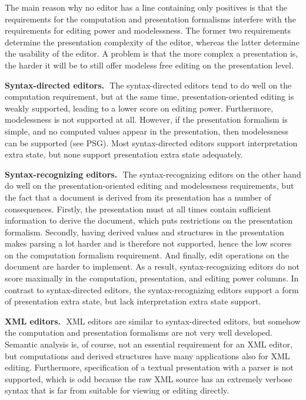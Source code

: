 \documentclass{entcs}
\begin{document}
The main reason why no editor has a line containing only positives is that the requirements for the computation and presentation formalisms interfere with the requirements for editing power and modelessness. The former two requirements determine the presentation complexity of the editor, whereas the latter determine the usability of the editor. A problem is that the more complex a presentation is, the harder it will be to still offer modeless free editing on the presentation level.

{\bf Syntax-directed editors.}~\,The syntax-directed editors tend to do well on the computation requirement, but at the same time, presentation-oriented editing is weakly supported, leading to a lower score on editing power. Furthermore, modelessness is not supported at all. However, if the presentation formalism is simple, and no computed values appear in the presentation, then modelessness can be supported (see PSG). Most syntax-directed editors support interpretation extra state, but none support presentation extra state adequately.

{\bf Syntax-recognizing editors.}~\,The syntax-recognizing editors on the other hand do well on the presentation-oriented editing and modelessness requirements, but the fact that a document is derived from its presentation has a number of consequences. Firstly, the presentation must at all times contain sufficient information to derive the document, which puts restrictions on the presentation formalism. Secondly, having derived values and structures in the presentation makes parsing a lot harder and is therefore not supported, hence the low scores on the computation formalism requirement. And finally, edit operations on the document are harder to implement. As a result, syntax-recognizing editors do not score maximally in the computation, presentation, and editing power columns. In contrast to syntax-directed editors, the syntax-recognizing editors support a form of presentation extra state, but lack interpretation extra state support.

{\bf XML editors.}~\,XML editors are similar to syntax-directed editors, but somehow the computation and presentation formalisms are not very well developed. Semantic analysis is, of course, not an essential requirement for an XML editor, but computations and derived structures have many applications also for XML editing. Furthermore, specification of a textual presentation with a parser is not supported, which is odd because the raw XML source has an extremely verbose syntax that is far from suitable for viewing or editing directly.
\end{document}
